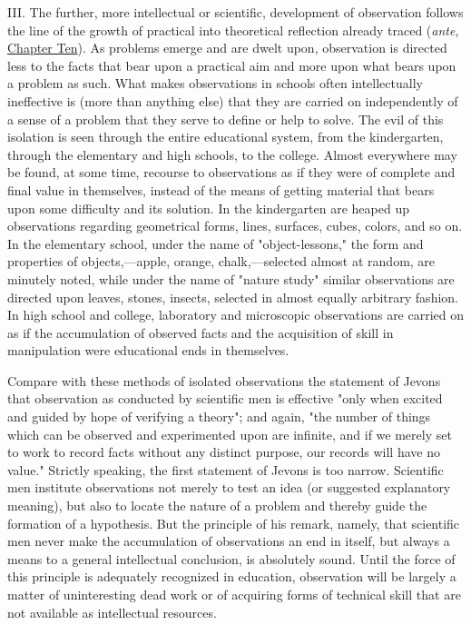 \documentclass[letterpaper]{book}
\begin{document}
III. The further, more intellectual or scientific, development of
observation follows the line of the growth of practical into theoretical
reflection already traced (\emph{ante},
\protect\hyperlink{ux40publicux40vhostux40gux40gutenbergux40htmlux40filesux4037423ux4037423-hux4037423-h-5.htm.htmlux5cux23CHAPTER_TEN}{Chapter
Ten}). As problems emerge and are dwelt upon, observation is directed
less to the facts that bear upon a practical aim and more upon what
bears upon a problem as such. What makes observations in schools often
intellectually ineffective is (more than anything else) that they are
carried on independently of a sense of a problem that they serve to
define or help to solve. The evil of this isolation is seen through the
entire educational system, from the kindergarten, through the elementary
and high schools, to the college. Almost everywhere may be found, at
some time, recourse to observations as if they were of complete and
final value in themselves, instead of the
means
of getting material that bears upon some difficulty and its solution. In
the kindergarten are heaped up observations regarding geometrical forms,
lines, surfaces, cubes, colors, and so on. In the elementary school,
under the name of "object-lessons," the form and properties of
objects,---apple, orange, chalk,---selected almost at random, are
minutely noted, while under the name of "nature study" similar
observations are directed upon leaves, stones, insects, selected in
almost equally arbitrary fashion. In high school and college, laboratory
and microscopic observations are carried on as if the accumulation of
observed facts and the acquisition of skill in manipulation were
educational ends in themselves.

Compare with these methods of isolated observations the statement of
Jevons that observation as conducted by scientific men is effective
"only when excited and guided by hope of verifying a theory"; and again,
"the number of things which can be observed and experimented upon are
infinite, and if we merely set to work to record facts without any
distinct purpose, our records will have no value." Strictly speaking,
the first statement of Jevons is too narrow. Scientific men institute
observations not merely to test an idea (or suggested explanatory
meaning), but also to locate the nature of a problem and thereby guide
the formation of a hypothesis. But the principle of his remark, namely,
that scientific men never make the accumulation of observations an end
in itself, but always a means to a general intellectual conclusion, is
absolutely sound. Until the force of this principle is adequately
recognized in education, observation will be largely a matter of
uninteresting dead work or of acquiring forms of technical skill that
are not available as intellectual
resources.
\end{document}
